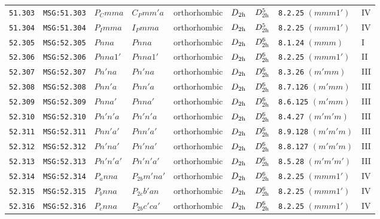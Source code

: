 \documentclass[fleqn,10pt]{jsarticle}
\begin{document}
\begin{center}
\begin{longtable}{lllllllll}
\texttt{51.303} & \texttt{MSG:51.303} & $P_{C}mma$ & $C_{P}mm'a$ & orthorhombic & $D_{\rm 2h}$ & $D_{\rm 2h}^{5}$ & \texttt{8.2.25} $(mmm1')$ & IV \\
\texttt{51.304} & \texttt{MSG:51.304} & $P_{I}mma$ & $I_{P}mma$ & orthorhombic & $D_{\rm 2h}$ & $D_{\rm 2h}^{5}$ & \texttt{8.2.25} $(mmm1')$ & IV \\ \hline
\texttt{52.305} & \texttt{MSG:52.305} & $Pnna$ & $Pnna$ & orthorhombic & $D_{\rm 2h}$ & $D_{\rm 2h}^{6}$ & \texttt{8.1.24} $(mmm)$ & I \\
\texttt{52.306} & \texttt{MSG:52.306} & $Pnna1'$ & $Pnna1'$ & orthorhombic & $D_{\rm 2h}$ & $D_{\rm 2h}^{6}$ & \texttt{8.2.25} $(mmm1')$ & II \\
\texttt{52.307} & \texttt{MSG:52.307} & $Pn'na$ & $Pn'na$ & orthorhombic & $D_{\rm 2h}$ & $D_{\rm 2h}^{6}$ & \texttt{8.3.26} $(m'mm)$ & III \\
\texttt{52.308} & \texttt{MSG:52.308} & $Pnn'a$ & $Pnn'a$ & orthorhombic & $D_{\rm 2h}$ & $D_{\rm 2h}^{6}$ & \texttt{8.7.126} $(m'mm)$ & III \\
\texttt{52.309} & \texttt{MSG:52.309} & $Pnna'$ & $Pnna'$ & orthorhombic & $D_{\rm 2h}$ & $D_{\rm 2h}^{6}$ & \texttt{8.6.125} $(m'mm)$ & III \\
\texttt{52.310} & \texttt{MSG:52.310} & $Pn'n'a$ & $Pn'n'a$ & orthorhombic & $D_{\rm 2h}$ & $D_{\rm 2h}^{6}$ & \texttt{8.4.27} $(m'm'm)$ & III \\
\texttt{52.311} & \texttt{MSG:52.311} & $Pnn'a'$ & $Pnn'a'$ & orthorhombic & $D_{\rm 2h}$ & $D_{\rm 2h}^{6}$ & \texttt{8.9.128} $(m'm'm)$ & III \\
\texttt{52.312} & \texttt{MSG:52.312} & $Pn'na'$ & $Pn'na'$ & orthorhombic & $D_{\rm 2h}$ & $D_{\rm 2h}^{6}$ & \texttt{8.8.127} $(m'm'm)$ & III \\
\texttt{52.313} & \texttt{MSG:52.313} & $Pn'n'a'$ & $Pn'n'a'$ & orthorhombic & $D_{\rm 2h}$ & $D_{\rm 2h}^{6}$ & \texttt{8.5.28} $(m'm'm')$ & III \\
\texttt{52.314} & \texttt{MSG:52.314} & $P_{a}nna$ & $P_{2b}m'na'$ & orthorhombic & $D_{\rm 2h}$ & $D_{\rm 2h}^{6}$ & \texttt{8.2.25} $(mmm1')$ & IV \\
\texttt{52.315} & \texttt{MSG:52.315} & $P_{b}nna$ & $P_{2c}b'an$ & orthorhombic & $D_{\rm 2h}$ & $D_{\rm 2h}^{6}$ & \texttt{8.2.25} $(mmm1')$ & IV \\
\texttt{52.316} & \texttt{MSG:52.316} & $P_{c}nna$ & $P_{2b}c'ca'$ & orthorhombic & $D_{\rm 2h}$ & $D_{\rm 2h}^{6}$ & \texttt{8.2.25} $(mmm1')$ & IV \\

\end{longtable}
\end{center}
\end{document}
